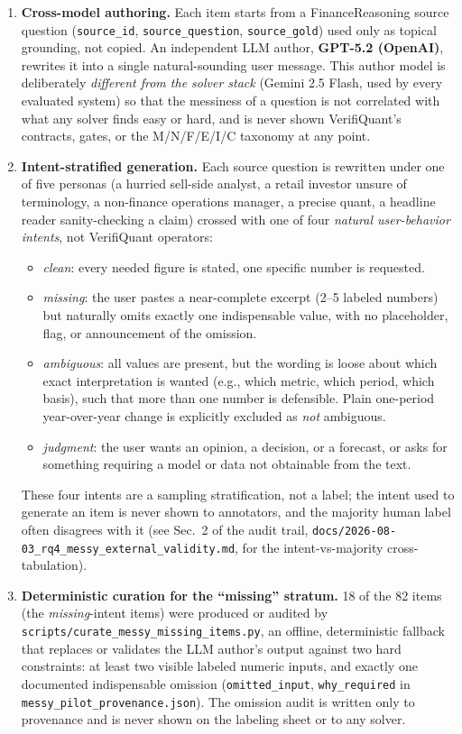 \documentclass[11pt]{article}
\begin{document}
\begin{enumerate}[leftmargin=*]
\item \textbf{Cross-model authoring.} Each item starts from a FinanceReasoning source question
(\texttt{source\_id}, \texttt{source\_question}, \texttt{source\_gold}) used only as topical
grounding, not copied. An independent LLM author, \textbf{GPT-5.2 (OpenAI)}, rewrites it into a
single natural-sounding user message. This author model is deliberately \emph{different from
the solver stack} (Gemini 2.5 Flash, used by every evaluated system) so that the messiness of a
question is not correlated with what any solver finds easy or hard, and is never shown
VerifiQuant's contracts, gates, or the M/N/F/E/I/C taxonomy at any point.
\item \textbf{Intent-stratified generation.} Each source question is rewritten under one of five
personas (a hurried sell-side analyst, a retail investor unsure of terminology, a non-finance
operations manager, a precise quant, a headline reader sanity-checking a claim) crossed with one
of four \emph{natural user-behavior intents}, not VerifiQuant operators:
  \begin{itemize}[leftmargin=*]
  \item \emph{clean}: every needed figure is stated, one specific number is requested.
  \item \emph{missing}: the user pastes a near-complete excerpt (2--5 labeled numbers) but
  naturally omits exactly one indispensable value, with no placeholder, flag, or announcement of
  the omission.
  \item \emph{ambiguous}: all values are present, but the wording is loose about which exact
  interpretation is wanted (e.g., which metric, which period, which basis), such that more than
  one number is defensible. Plain one-period year-over-year change is explicitly excluded as
  \emph{not} ambiguous.
  \item \emph{judgment}: the user wants an opinion, a decision, or a forecast, or asks for
  something requiring a model or data not obtainable from the text.
  \end{itemize}
  These four intents are a sampling stratification, not a label; the intent used to generate an
  item is never shown to annotators, and the majority human label often disagrees with it (see
  Sec.~2 of the audit trail, \texttt{docs/2026-08-03\_rq4\_messy\_external\_validity.md}, for the
  intent-vs-majority cross-tabulation).
\item \textbf{Deterministic curation for the ``missing'' stratum.} 18 of the 82 items (the
\emph{missing}-intent items) were produced or audited by
\texttt{scripts/curate\_messy\_missing\_items.py}, an offline, deterministic fallback that
replaces or validates the LLM author's output against two hard constraints: at least two visible
labeled numeric inputs, and exactly one documented indispensable omission
(\texttt{omitted\_input}, \texttt{why\_required} in \texttt{messy\_pilot\_provenance.json}). The
omission audit is written only to provenance and is never shown on the labeling sheet or to any
solver.
\end{enumerate}
\end{document}
